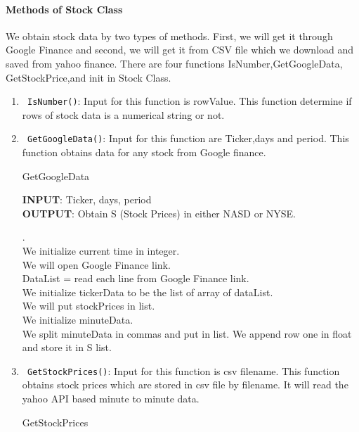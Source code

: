 \paragraph{Methods of Stock Class}
We obtain stock data by two types of methods. First, we will get it through Google Finance and second, we will get it from CSV file which we download and saved from yahoo finance.
There are four functions IsNumber,GetGoogleData, GetStockPrice,and init in Stock Class.
\begin{enumerate}
  \item \verb! IsNumber()!: Input for this function is rowValue. This function determine if rows of stock data is a numerical string or not.
  \item \verb! GetGoogleData()!: Input for this function are Ticker,days and period. This function obtains data for any stock from Google
  finance.
  \begin{algorithm}
  \caption{GetGoogleData}
  \bigskip
  \textbf{INPUT}: Ticker, days, period\\
  \textbf{OUTPUT}: Obtain S (Stock Prices) in either NASD or NYSE.
  \begin{algorithmic}[1]
  .
  \Else 
  \EndIf\\
  We initialize current time in integer.\\
  We will open Google Finance link.\\
  DataList = read each line from Google Finance link.\\
  We initialize tickerData to be the list of array of dataList.\\
  We will put stockPrices in list.\\
  We initialize  minuteData.\\
  \State We split minuteData in commas and put in list.
  \State We append row one in float and store it in S list.\\
  \end{algorithmic}
  \end{algorithm}
  \item \verb! GetStockPrices()!: Input for this function is csv filename. This function obtains stock prices which are stored
  in csv file by filename. It will read the yahoo API based minute to minute data.
  \begin{algorithm}
  \caption{GetStockPrices}

\end{algorithm}
\end{enumerate}
